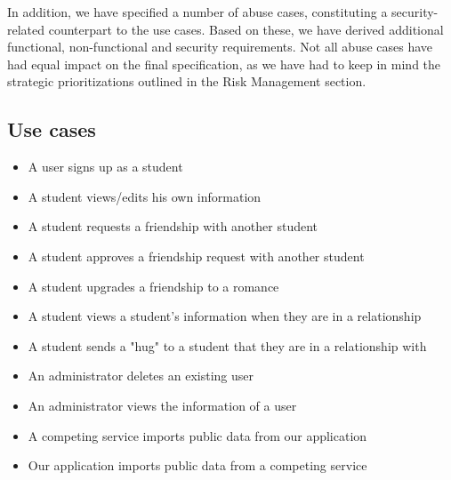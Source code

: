 \documentclass[a4paper]{article}
\begin{document}
In addition, we have specified a number of abuse cases, constituting a security-related counterpart to the use cases. Based on these, we have derived additional functional, non-functional and security requirements. Not all abuse cases have had equal impact on the final specification, as we have had to keep in mind the strategic prioritizations outlined in the Risk Management section.

\subsection{Use cases}
\begin{itemize}
\item A user signs up as a student
\item A student views/edits his own information
\item A student requests a friendship with another student
\item A student approves a friendship request with another student
\item A student upgrades a friendship to a romance
\item A student views a student’s information when they are in a relationship
\item A student sends a "hug" to a student that they are in a relationship with
\item An administrator deletes an existing user
\item An administrator views the information of a user
\item A competing service imports public data from our application
\item Our application imports public data from a competing service
\end{itemize}
\end{document}
